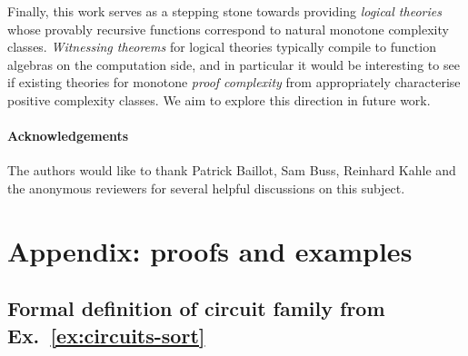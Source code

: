 \documentclass{lmcs}
\begin{document}
Finally, this work serves as a stepping stone towards providing \emph{logical theories} whose provably recursive functions correspond to natural monotone complexity classes. \emph{Witnessing theorems} for logical theories typically compile to function algebras on the computation side, and in particular it would be interesting to see if existing theories for monotone \emph{proof complexity} from \cite{Das16} appropriately characterise positive complexity classes.
We aim to explore this direction in future work.


\paragraph*{Acknowledgements}
The authors would like to thank Patrick Baillot, Sam Buss, Reinhard Kahle and the anonymous reviewers for several helpful discussions on this subject.





%



\appendix


\section{Appendix: proofs and examples} %
\label{sect:app:prfs-ex}


\subsection{Formal definition of circuit family from Ex.~\ref{ex:circuits-sort}}
\end{document}
